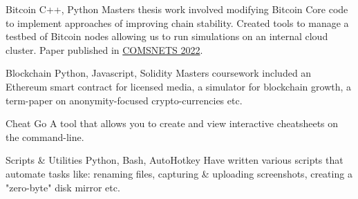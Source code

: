     {Bitcoin}
    {}
    {\scriptsize C++, Python}
    {}
    {
        Masters thesis work involved modifying Bitcoin Core code to implement approaches of improving chain stability.
        Created tools to manage a testbed of Bitcoin nodes allowing us to run simulations on an internal cloud cluster.
        Paper published in \href{https://dblp.org/pid/172/8850.html}{COMSNETS 2022}.
    }
    \vspace*{0.2\baselineskip}

    {Blockchain}
    {}
    {\scriptsize Python, Javascript, Solidity}
    {}
    {
        Masters coursework included
        an Ethereum smart contract for licensed media,
        a simulator for blockchain growth,
        a term-paper on anonymity-focused crypto-currencies etc.
    }
    \vspace*{0.2\baselineskip}



\cventry{}
    {Cheat}
    {}
    {\scriptsize Go}
    {}
    {
        A tool that allows you to create and view interactive cheatsheets on the command-line.
    }
    \vspace*{0.2\baselineskip}


\cventry{}
    {Scripts \& Utilities}
    {}
    {\scriptsize Python, Bash, AutoHotkey}
    {}
    {
        Have written various scripts that automate tasks like:
        renaming files,
        capturing \& uploading screenshots,
        creating a "zero-byte" disk mirror etc.
    }
    \vspace*{0.2\baselineskip}
